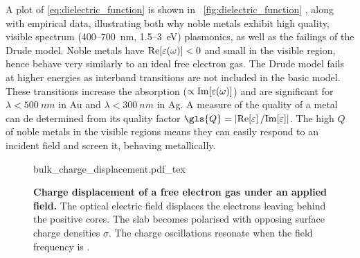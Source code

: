 \documentclass{article}
\begin{document}
A plot of \eqref{eq:dielectric_function} is shown in \figurename~\ref{fig:dielectric_function} , along with empirical data, illustrating both why noble metals exhibit high quality, visible spectrum (400--\SI{700}{nm}, 1.5--\SI{3}{eV}) plasmonics, as well as the failings of the Drude model. Noble metals have $\mathrm{Re}\!\left[{\varepsilon(\omega)}\right]<0$ and small \imag{\dielectric} in the visible region, hence behave very similarly to an ideal free electron gas. The Drude model fails at higher energies as interband transitions are not included in the basic model. These transitions increase the absorption ($\propto\mathrm{Im}\!\left[{\varepsilon(\omega)}\right]$) and are significant for $\lambda < \SI{500}{nm}$ in Au and $\lambda<\SI{300}{nm}$ in Ag. A measure of the quality of a metal can de determined from its quality factor $\gls{Q} = \left|\real{\eps}/\imag{\eps}\right|$. The high $Q$ of noble metals in the visible regions means they can easily respond to an incident field and screen it, behaving metallically. %

\begin{figure}[bt]
\centering
\fontsize{10pt}{1em}\selectfont
{bulk_charge_displacement.pdf_tex}
\caption[Charge displacement of a free electron gas under an applied field]{\textbf{Charge displacement of a free electron gas under an applied field.} The optical electric field displaces the electrons leaving behind the positive cores. The slab becomes polarised with opposing surface charge densities $\sigma$. The charge oscillations resonate when the field frequency is \omegap.}
\label{fig:bulk_charge_displacement}
\end{figure}
\end{document}

